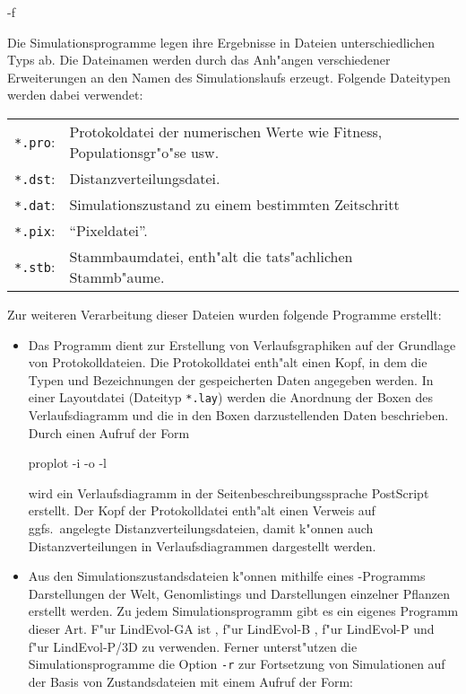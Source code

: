 \begin{appendix}
\begin{verbatimcmd}
 -f 
\end{verbatimcmd}


Die Simulationsprogramme legen ihre Ergebnisse in Dateien unterschiedlichen Typs ab. Die Dateinamen
werden durch das Anh"angen verschiedener Erweiterungen an den Namen des Simulationslaufs erzeugt.
Folgende Dateitypen werden dabei verwendet:

\medskip
\begin{tabular}{ll}
\verb|*.pro|: & Protokoldatei der numerischen Werte wie Fitness, Populationsgr"o"se usw. \\
\verb|*.dst|: & Distanzverteilungsdatei. \\
\verb|*.dat|: & Simulationszustand zu einem bestimmten Zeitschritt \\
\verb|*.pix|: & "`Pixeldatei"'. \\
\verb|*.stb|: & Stammbaumdatei, enth"alt die tats"achlichen Stammb"aume. \\
\end{tabular}
\medskip

Zur weiteren Verarbeitung dieser Dateien wurden folgende Programme erstellt:

\begin{itemize}

\item Das Programm  dient zur Erstellung von Verlaufsgraphiken auf der Grundlage
von Protokolldateien. Die Protokolldatei enth"alt einen Kopf, in dem die Typen und Bezeichnungen
der gespeicherten Daten angegeben werden. In einer Layoutdatei (Dateityp \verb|*.lay|) werden die
Anordnung der Boxen des Verlaufsdiagramm und die in den Boxen darzustellenden Daten beschrieben.
Durch einen Aufruf der Form

\begin{verbatimcmd}
proplot -i  -o  -l 
\end{verbatimcmd}

wird ein Verlaufsdiagramm in der Seitenbeschreibungssprache PostScript \cite{PostScript} erstellt.
Der Kopf der Protokolldatei enth"alt einen Verweis auf ggfs.\ angelegte Distanzverteilungsdateien,
damit k"onnen auch Distanzverteilungen in Verlaufsdiagrammen dargestellt werden.

\item Aus den Simulationszustandsdateien k"onnen mithilfe eines -Programms Darstellungen
der Welt, Genomlistings und Darstellungen einzelner Pflanzen erstellt werden. Zu jedem Simulationsprogramm
gibt es ein eigenes Programm dieser Art. F"ur LindEvol-GA ist , f"ur LindEvol-B ,
f"ur LindEvol-P  und f"ur LindEvol-P/3D  zu verwenden. Ferner unterst"utzen
die Simulationsprogramme die Option \verb|-r| zur Fortsetzung von Simulationen auf der Basis von Zustandsdateien
mit einem Aufruf der Form:


\end{itemize}
\end{appendix}
